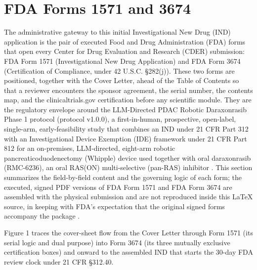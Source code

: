 \section{FDA Forms 1571 and 3674}

The administrative gateway to this initial Investigational New Drug
(IND) application is the pair of executed Food and Drug Administration
(FDA) forms that open every Center for Drug Evaluation and Research (CDER)
submission: FDA Form 1571 (Investigational New Drug Application) and FDA
Form 3674 (Certification of Compliance, under 42 U.S.C. \S 282(j)). These
two forms are positioned, together with the Cover Letter, ahead of the
Table of Contents so that a reviewer encounters the sponsor agreement, the
serial number, the contents map, and the clinicaltrials.gov certification
before any scientific module. They are the regulatory envelope around the
LLM-Directed PDAC Robotic Daraxonrasib Phase 1 protocol (protocol
v1.0.0), a first-in-human, prospective, open-label, single-arm,
early-feasibility study that combines an IND under 21 CFR Part 312 with an
Investigational Device Exemption (IDE) framework under 21 CFR Part 812 for
an on-premises, LLM-directed, eight-arm robotic pancreaticoduodenectomy
(Whipple) device used together with oral daraxonrasib (RMC-6236), an oral
RAS(ON) multi-selective (pan-RAS) inhibitor \cite{daraxwhipple,
onpremwhippl}. This section summarizes the field-by-field content and the
governing logic of each form; the executed, signed PDF versions of FDA
Form 1571 and FDA Form 3674 are assembled with the physical submission and
are not reproduced inside this LaTeX source, in keeping with FDA's
expectation that the original signed forms accompany the package
\cite{phase1guidance, cfr312paiuni}.

Figure 1 traces the cover-sheet flow from the Cover Letter through Form
1571 (its serial logic and dual purpose) into Form 3674 (its three
mutually exclusive certification boxes) and onward to the assembled IND
that starts the 30-day FDA review clock under 21 CFR \S 312.40.

